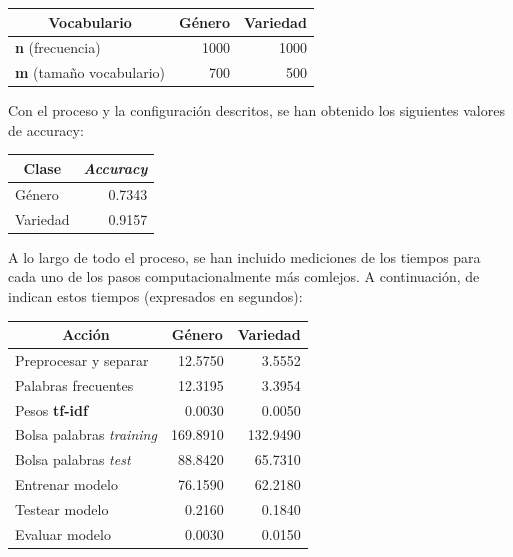 \documentclass[11pt,a4paper]{article}
\begin{document}
\begin{center}
\begin{tabular}{|l|l|l|}
\hline
\multicolumn{1}{|c|}{\textbf{Vocabulario}} & \multicolumn{1}{|c|}{\textbf{G\'enero}} & \multicolumn{1}{|c|}{\textbf{Variedad}} \\
\hline \hline
\textbf{n} (frecuencia) & \multicolumn{1}{|r|}{1000} & \multicolumn{1}{|r|}{1000} \\ \hline
\textbf{m} (tama\~{n}o vocabulario) & \multicolumn{1}{|r|}{700} & \multicolumn{1}{|r|}{500} \\ \hline
\end{tabular}
\end{center}

Con el proceso y la configuraci\'on descritos, se han obtenido los siguientes valores de accuracy:

\begin{center}
\begin{tabular}{|l|l|}
\hline
\multicolumn{1}{|c|}{\textbf{Clase}} & \multicolumn{1}{|c|}{\textbf{\textit{Accuracy}}} \\
\hline \hline
G\'enero & \multicolumn{1}{|r|}{0.7343} \\ \hline
Variedad & \multicolumn{1}{|r|}{0.9157} \\ \hline
\end{tabular}
\end{center}

A lo largo de todo el proceso, se han incluido mediciones de los tiempos para cada uno de los pasos computacionalmente m\'as comlejos. A continuaci\'on, de indican estos tiempos (expresados en segundos):

\begin{center}
\begin{tabular}{|l|l|l|}
\hline
\multicolumn{1}{|c|}{\textbf{Acci\'on}} & \multicolumn{1}{|c|}{\textbf{G\'enero}} & \multicolumn{1}{|c|}{\textbf{Variedad}} \\
\hline \hline
Preprocesar y separar & \multicolumn{1}{|r|}{12.5750} & \multicolumn{1}{|r|}{3.5552} \\ \hline
Palabras frecuentes & \multicolumn{1}{|r|}{12.3195} & \multicolumn{1}{|r|}{3.3954} \\ \hline
Pesos \textbf{tf-idf} & \multicolumn{1}{|r|}{0.0030} & \multicolumn{1}{|r|}{0.0050} \\ \hline
Bolsa palabras \textit{training} & \multicolumn{1}{|r|}{169.8910} & \multicolumn{1}{|r|}{132.9490} \\ \hline
Bolsa palabras \textit{test} & \multicolumn{1}{|r|}{88.8420} & \multicolumn{1}{|r|}{65.7310} \\ \hline
Entrenar modelo & \multicolumn{1}{|r|}{76.1590} & \multicolumn{1}{|r|}{62.2180} \\ \hline
Testear modelo & \multicolumn{1}{|r|}{0.2160} & \multicolumn{1}{|r|}{0.1840} \\ \hline
Evaluar modelo & \multicolumn{1}{|r|}{0.0030} & \multicolumn{1}{|r|}{0.0150} \\ \hline
\end{tabular}
\end{center}
\end{document}
